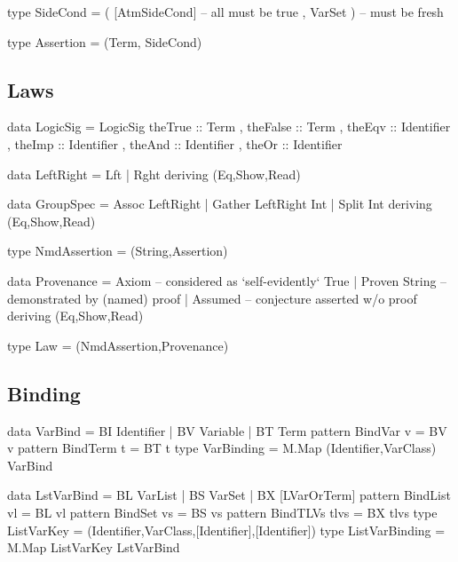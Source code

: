 \begin{code}
type SideCond = ( [AtmSideCond]  -- all must be true
                , VarSet )       -- must be fresh
\end{code}

\begin{code}
type Assertion = (Term, SideCond)
\end{code}

\newpage
\subsection{Laws}

\begin{code}
data LogicSig
  = LogicSig
     { theTrue  :: Term
     , theFalse :: Term
     , theEqv   :: Identifier
     , theImp   :: Identifier
     , theAnd   :: Identifier
     , theOr    :: Identifier
     }
\end{code}

\begin{code}
data LeftRight = Lft | Rght deriving (Eq,Show,Read)

data GroupSpec
  = Assoc LeftRight
  | Gather LeftRight Int
  | Split Int
  deriving (Eq,Show,Read)
\end{code}

\begin{code}
type NmdAssertion = (String,Assertion)
\end{code}

\begin{code}
data Provenance
  = Axiom          --  considered as `self-evidently` True
  | Proven String  --  demonstrated by (named) proof
  | Assumed        --  conjecture asserted w/o proof
  deriving (Eq,Show,Read)
\end{code}

\begin{code}
type Law = (NmdAssertion,Provenance)
\end{code}

\subsection{Binding}

\begin{code}
data VarBind = BI Identifier | BV Variable | BT Term
pattern BindVar  v  =  BV v
pattern BindTerm t  =  BT t
type VarBinding = M.Map (Identifier,VarClass) VarBind
\end{code}

\begin{code}
data LstVarBind
 = BL  VarList
 | BS  VarSet
 | BX  [LVarOrTerm]
pattern BindList vl      =  BL vl
pattern BindSet  vs      =  BS vs
pattern BindTLVs tlvs    =  BX tlvs
type ListVarKey = (Identifier,VarClass,[Identifier],[Identifier])
type ListVarBinding = M.Map ListVarKey LstVarBind
\end{code}

